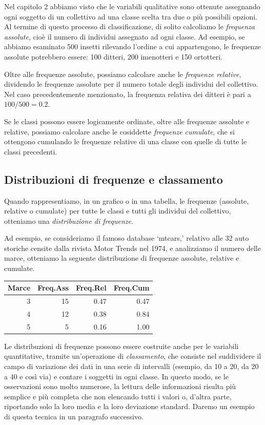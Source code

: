 \documentclass[a4paper,12pt,oneside]{book}
\begin{document}
Nel capitolo 2 abbiamo visto che le variabili qualitative sono ottenute assegnando ogni soggetto di un collettivo ad una classe scelta tra due o più possibili opzioni. Al termine di questo processo di classificazione, di solito calcoliamo le \emph{frequenza assolute}, cioè il numero di individui assegnato ad ogni classe. Ad esempio, se abbiamo esaminato 500 insetti rilevando l'ordine a cui appartengono, le frequenze assolute potrebbero essere: 100 ditteri, 200 imenotteri e 150 ortotteri.

Oltre alle frequenze assolute, possiamo calcolare anche le \emph{frequenze relative}, dividendo le frequenze assolute per il numero totale degli individui del collettivo. Nel caso precedentemente menzionato, la frequenza relativa dei ditteri è pari a \(100/500 = 0.2\).

Se le classi possono essere logicamente ordinate, oltre alle frequenze assolute e relative, possiamo calcolare anche le cosiddette \emph{frequenze cumulate}, che si ottengono cumulando le frequenze relative di una classe con quelle di tutte le classi precedenti.

\hypertarget{distribuzioni-di-frequenze-e-classamento}{%
\subsection{Distribuzioni di frequenze e classamento}\label{distribuzioni-di-frequenze-e-classamento}}

Quando rappresentiamo, in un grafico o in una tabella, le frequenze (assolute, relative o cumulate) per tutte le classi e tutti gli individui del collettivo, otteniamo una \emph{distribuzione di frequenze}.

Ad esempio, se consideriamo il famoso database `mtcars,' relativo alle 32 auto storiche censite dalla rivista Motor Trends nel 1974, e analizziamo il numero delle marce, otteniamo la seguente distribuzione di frequenze assolute, relative e cumulate.

\begin{tabular}{r|r|r|r}
\hline
Marce & Freq.Ass & Freq.Rel & Freq.Cum\\
\hline
3 & 15 & 0.47 & 0.47\\
\hline
4 & 12 & 0.38 & 0.84\\
\hline
5 & 5 & 0.16 & 1.00\\
\hline
\end{tabular}

Le distribuzioni di frequenze possono essere costruite anche per le variabili quantitative, tramite un'operazione di \emph{classamento}, che consiste nel suddividere il campo di variazione dei dati in una serie di intervalli (esempio, da 10 a 20, da 20 a 40 e così via) e contare i soggetti in ogni classe. In questo modo, se le osservazioni sono molto numerose, la lettura delle informazioni risulta più semplice e più completa che non elencando tutti i valori o, d'altra parte, riportando solo la loro media e la loro deviazione standard. Daremo un esempio di questa tecnica in un paragrafo successivo.
\end{document}
